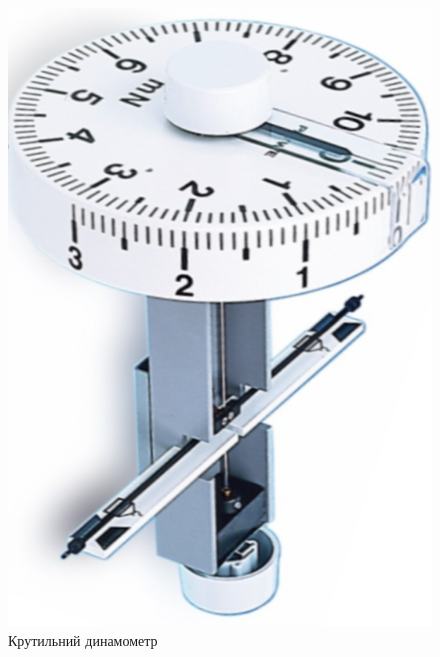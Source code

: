 \documentclass{LabWork}
\begin{document}
\begin{figure}[htbp!]\centering
	\begin{minipage}[t]{0.47\linewidth}\centering
			\includegraphics[width=0.9\linewidth]{TorsionDynamometer}
			\caption{Крутильний динамометр}
			\label{pic:Torsion_Dynamometr}
	\end{minipage}
	\quad%
	\begin{minipage}[t]{0.47\linewidth}\centering

\end{minipage}
\end{figure}
\end{document}
